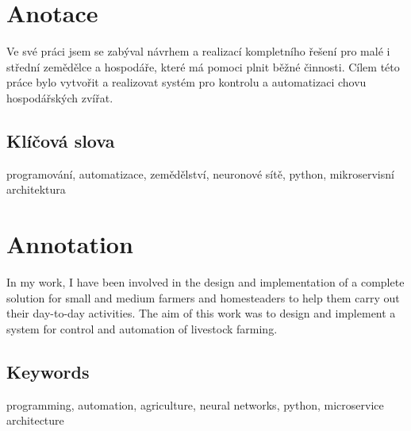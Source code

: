 \documentclass{template/socthesis}
\author{Jaroslav Němec}
\begin{document}
    \maketitle



    \pagestyle{empty}

    \section*{Anotace}
    Ve své práci jsem se zabýval návrhem a realizací kompletního řešení pro malé i střední zemědělce a hospodáře, které má pomoci plnit běžné činnosti. Cílem této práce bylo vytvořit a realizovat systém pro kontrolu a automatizaci chovu hospodářských zvířat.

    \subsection*{Klíčová slova}
    programování, automatizace, zemědělství, neuronové sítě, python, mikroservisní architektura

    \vspace{20mm}

    \section*{Annotation}
    In my work, I have been involved in the design and implementation of a complete solution for small and medium farmers and homesteaders to help them carry out their day-to-day activities. The aim of this work was to design and implement a system for control and automation of livestock farming.

    \subsection*{Keywords}
    programming, automation, agriculture, neural networks, python, microservice architecture

    \newpage
    \pagestyle{plain}

    \tableofcontents %

    \setcounter{figure}{0}
    \setcounter{table}{0}
    \newpage
\end{document}
